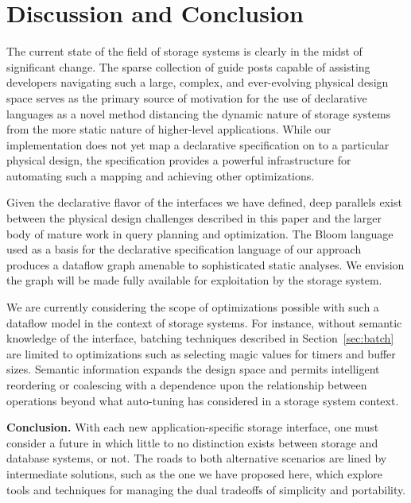 \section{Discussion and Conclusion}
\label{sec:opts}

The current state of the field of storage systems is clearly in the midst of significant
change. The sparse collection of guide posts capable of assisting developers navigating such a
large, complex, and ever-evolving physical design space serves as the primary source of 
motivation for the use of declarative languages as a novel method distancing 
the dynamic nature of storage systems from the more static nature of higher-level
applications. While our implementation does not yet map a declarative specification 
on to a particular physical design, the specification provides a powerful infrastructure for
automating such a mapping and achieving other optimizations.

Given the declarative flavor of the interfaces we have defined, 
deep parallels exist between the physical design challenges described in this paper and
the larger body of mature work in query planning and optimization. The Bloom
language used as a basis for the declarative specification language of our approach
produces a dataflow graph amenable to sophisticated static analyses. We
envision the graph will be made fully available for exploitation by the storage system.

We are currently considering the scope of optimizations possible with
such a dataflow model in the context of storage systems. For instance, without
semantic knowledge of the interface, batching techniques described in
Section~\ref{sec:batch} are limited to optimizations such as selecting magic
values for timers and buffer sizes. Semantic information expands the design
space and permits intelligent reordering or coalescing with a dependence upon the
relationship between operations beyond what auto-tuning has considered in a storage system context.

{\bf Conclusion.} With each new application-specific storage interface, one
must consider a future in which little to no
distinction exists between storage and database systems, or not. The roads to both alternative scenarios
are lined by intermediate solutions, such as the one we have proposed here, which 
explore tools and techniques for managing the dual tradeoffs of simplicity and portability.

